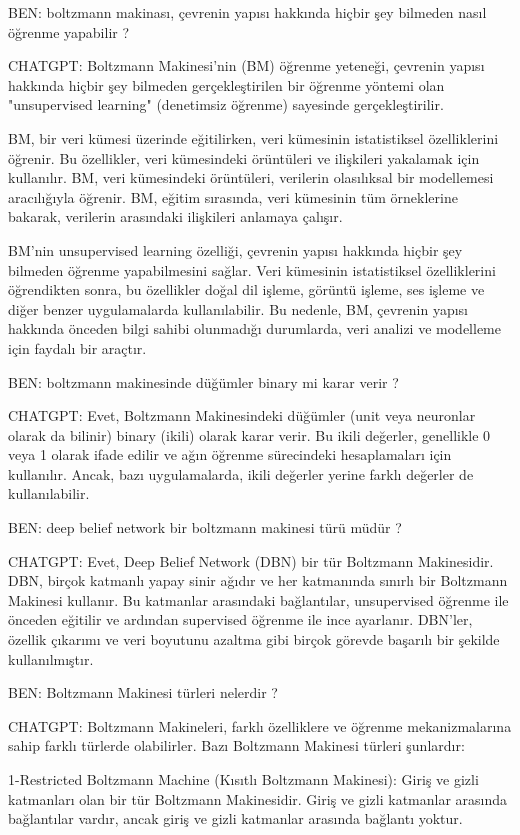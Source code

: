 \documentclass[11pt]{article}
\begin{document}
BEN: boltzmann makinası, çevrenin yapısı hakkında hiçbir şey bilmeden nasıl öğrenme yapabilir ?

CHATGPT: Boltzmann Makinesi'nin (BM) öğrenme yeteneği, çevrenin yapısı hakkında hiçbir şey bilmeden gerçekleştirilen bir öğrenme yöntemi olan "unsupervised learning" (denetimsiz öğrenme) sayesinde gerçekleştirilir.

BM, bir veri kümesi üzerinde eğitilirken, veri kümesinin istatistiksel özelliklerini öğrenir. Bu özellikler, veri kümesindeki örüntüleri ve ilişkileri yakalamak için kullanılır. BM, veri kümesindeki örüntüleri, verilerin olasılıksal bir modellemesi aracılığıyla öğrenir. BM, eğitim sırasında, veri kümesinin tüm örneklerine bakarak, verilerin arasındaki ilişkileri anlamaya çalışır.

BM'nin unsupervised learning özelliği, çevrenin yapısı hakkında hiçbir şey bilmeden öğrenme yapabilmesini sağlar. Veri kümesinin istatistiksel özelliklerini öğrendikten sonra, bu özellikler doğal dil işleme, görüntü işleme, ses işleme ve diğer benzer uygulamalarda kullanılabilir. Bu nedenle, BM, çevrenin yapısı hakkında önceden bilgi sahibi olunmadığı durumlarda, veri analizi ve modelleme için faydalı bir araçtır.

BEN: boltzmann makinesinde düğümler binary mi karar verir ?

CHATGPT: Evet, Boltzmann Makinesindeki düğümler (unit veya neuronlar olarak da bilinir) binary (ikili) olarak karar verir. Bu ikili değerler, genellikle 0 veya 1 olarak ifade edilir ve ağın öğrenme sürecindeki hesaplamaları için kullanılır. Ancak, bazı uygulamalarda, ikili değerler yerine farklı değerler de kullanılabilir.

BEN: deep belief network bir boltzmann makinesi türü müdür ?

CHATGPT: Evet, Deep Belief Network (DBN) bir tür Boltzmann Makinesidir. DBN, birçok katmanlı yapay sinir ağıdır ve her katmanında sınırlı bir Boltzmann Makinesi kullanır. Bu katmanlar arasındaki bağlantılar, unsupervised öğrenme ile önceden eğitilir ve ardından supervised öğrenme ile ince ayarlanır. DBN'ler, özellik çıkarımı ve veri boyutunu azaltma gibi birçok görevde başarılı bir şekilde kullanılmıştır.

BEN: Boltzmann Makinesi türleri nelerdir ?

CHATGPT: 
Boltzmann Makineleri, farklı özelliklere ve öğrenme mekanizmalarına sahip farklı türlerde olabilirler. Bazı Boltzmann Makinesi türleri şunlardır:

1-Restricted Boltzmann Machine (Kısıtlı Boltzmann Makinesi): Giriş ve gizli katmanları olan bir tür Boltzmann Makinesidir. Giriş ve gizli katmanlar arasında bağlantılar vardır, ancak giriş ve gizli katmanlar arasında bağlantı yoktur.
\end{document}
